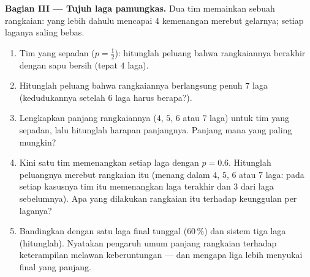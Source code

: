 \begin{problem}
\medskip
\noindent\textbf{Bagian III --- Tujuh laga pamungkas.}
Dua tim memainkan sebuah rangkaian: yang lebih dahulu mencapai $4$ kemenangan
merebut gelarnya; setiap laganya saling bebas.
\begin{enumerate}[resume]
  \item Tim yang sepadan ($p = \frac12$): hitunglah peluang
        bahwa rangkaiannya berakhir dengan sapu bersih (tepat $4$ laga).
  \item Hitunglah peluang bahwa rangkaiannya berlangsung penuh
        $7$ laga (kedudukannya setelah $6$ laga harus berapa?).
  \item Lengkapkan  panjang rangkaiannya
        ($4$, $5$, $6$ atau $7$ laga) untuk tim yang sepadan, lalu
        hitunglah harapan panjangnya. Panjang mana yang paling mungkin?
  \item Kini satu tim memenangkan setiap laga dengan $p = 0.6$. Hitunglah
        peluangnya merebut rangkaian itu (menang dalam $4$, $5$, $6$
        atau $7$ laga: pada setiap kasusnya tim itu memenangkan laga terakhir
        dan $3$ dari laga sebelumnya). Apa yang dilakukan rangkaian itu
        terhadap keunggulan per laganya?
  \item Bandingkan dengan satu laga final tunggal ($60\,\%$) dan sistem
        tiga laga (hitunglah). Nyatakan pengaruh umum panjang rangkaian
        terhadap keterampilan melawan keberuntungan --- dan mengapa liga
        lebih menyukai final yang panjang.
\end{enumerate}


\end{problem}
